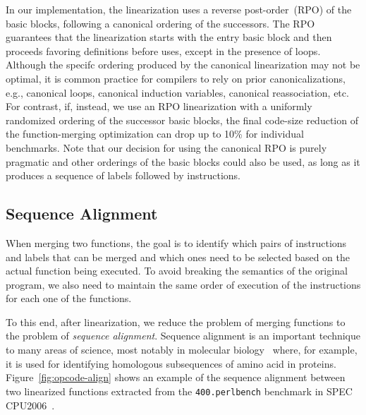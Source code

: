 In our implementation, the linearization uses a reverse post-order~(RPO) of the
basic blocks, following a canonical ordering of the successors.
The RPO guarantees that the linearization starts with the entry basic block and
then proceeds favoring definitions before uses, except in the presence of loops.
Although the specifc ordering produced by the canonical linearization may not
be optimal, it is common practice for compilers to rely on prior
canonicalizations, e.g., 
canonical loops, canonical induction variables, canonical reassociation, etc.
For contrast, if, instead, we use an RPO linearization with a uniformly
randomized ordering of the successor basic blocks, the final code-size reduction
of the function-merging optimization can drop up to 10\% for individual
benchmarks.
Note that our decision for using the canonical RPO is purely pragmatic and
other orderings of the basic blocks could also be used, as long as it produces
a sequence of labels followed by instructions.


\subsection{Sequence Alignment}

When merging two functions, the goal is to identify which pairs of instructions
and labels that can be merged and which ones need to be selected based on the
actual function being executed.
To avoid breaking the semantics of the original program, we also need to
maintain the same order of execution of the instructions for each one of
the functions.

To this end, after linearization, we reduce the problem of merging functions
to the problem of \textit{sequence alignment}. %
Sequence alignment is an important technique to many areas of science,
most notably in molecular biology~\cite{needleman70,smith81,carrillo88,wang94}
where, for example, it is used for identifying homologous subsequences of amino
acid in proteins.
Figure~\ref{fig:opcode-align} shows an example of the sequence alignment
between two linearized functions extracted from the \texttt{400.perlbench} benchmark
in SPEC CPU2006~\cite{spec}.

